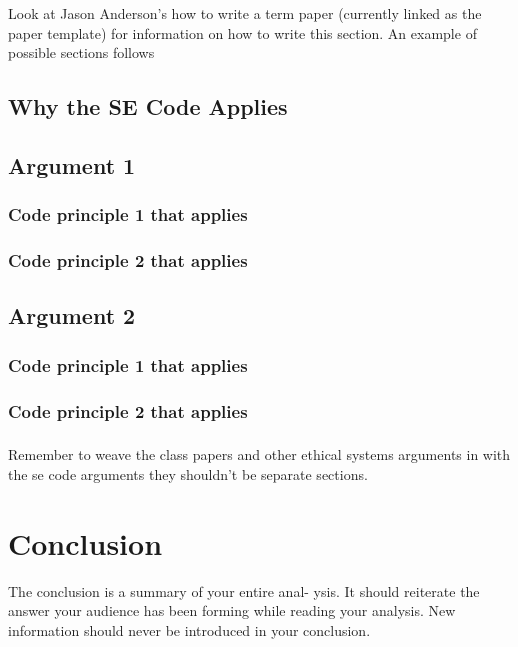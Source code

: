 \documentclass[11pt]{article}
\begin{document}
\begin{multicols}{2}
Look at Jason Anderson's how to write a term paper (currently linked as the
paper template) for information on how to write this section.  An example of
possible sections follows \subsection{Why the SE Code Applies}
\subsection{Argument 1} \subsubsection{Code principle 1 that applies}
\subsubsection{Code principle 2 that applies} \subsection{Argument 2}
\subsubsection{Code principle 1 that applies} \subsubsection{Code principle 2
that applies}

\subsubsection*{} Remember to weave the class papers and other ethical systems
arguments in with the se code arguments they shouldn't be separate sections.

\section{Conclusion} The conclusion is a summary of your entire anal- ysis. It
should reiterate the answer your audience has been forming while reading your
analysis. New information should never be introduced in your conclusion.
\cite{texTemp}

\end{multicols} \newpage

\nocite{*}




\end{document}

